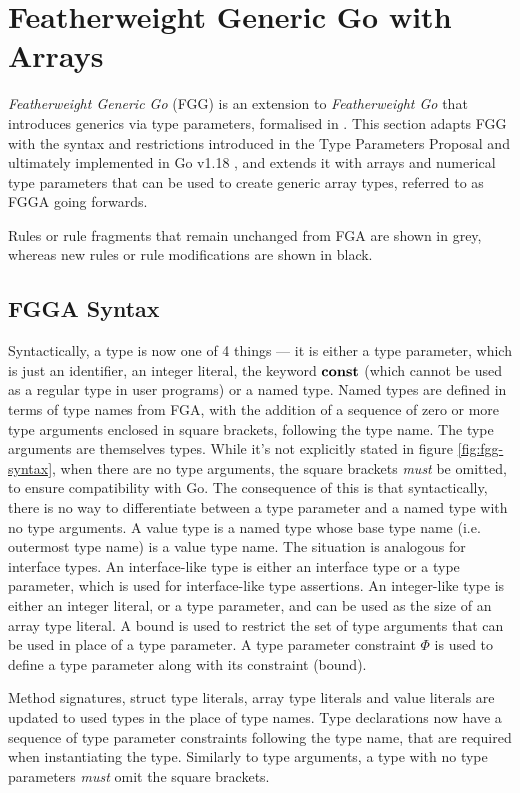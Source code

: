 \section{Featherweight Generic Go with Arrays}
\label{ch:fgg}

\emph{Featherweight Generic Go} (FGG) is an extension to \emph{Featherweight Go}
that introduces generics via type parameters, formalised in \autocite{fg}. This
section adapts FGG with the syntax and restrictions introduced in the Type
Parameters Proposal and ultimately implemented in Go v1.18
\autocite{genericsProposal}, and extends it with arrays and numerical type
parameters that can be used to create generic array types, referred to as FGGA
going forwards.

Rules or rule fragments that remain unchanged from FGA are shown in grey,
whereas new rules or rule modifications are shown in black.

\subsection{FGGA Syntax}

Syntactically, a type is now one of 4 things --- it is either a type parameter,
which is just an identifier, an integer literal, the keyword $\texttt{\bf const}$ (which
cannot be used as a regular type in user programs) or a named type. Named types
are defined in terms of type names from FGA, with the addition of a sequence of
zero or more type arguments enclosed in square brackets, following the type
name. The type arguments are themselves types. While it's not explicitly stated
in figure \ref{fig:fgg-syntax}, when there are no type arguments, the square
brackets \emph{must} be omitted, to ensure compatibility with Go. The
consequence of this is that syntactically, there is no way to differentiate
between a type parameter and a named type with no type arguments. A value type
is a named type whose base type name (i.e. outermost type name) is a value type
name. The situation is analogous for interface types. An interface-like type is
either an interface type or a type parameter, which is used for interface-like
type assertions. An integer-like type is either an integer literal, or a type
parameter, and can be used as the size of an array type literal. A bound is used
to restrict the set of type arguments that can be used in place of a type
parameter. A type parameter constraint $\Phi$ is used to define a type parameter
along with its constraint (bound).

Method signatures, struct type literals, array type literals and value literals
are updated to used types in the place of type names. Type declarations now have
a sequence of type parameter constraints following the type name, that are
required when instantiating the type. Similarly to type arguments, a type with
no type parameters \emph{must} omit the square brackets.

